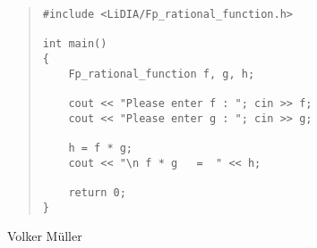 
\EXAMPLES

\begin{quote}
\begin{verbatim}
#include <LiDIA/Fp_rational_function.h>

int main()
{
    Fp_rational_function f, g, h;

    cout << "Please enter f : "; cin >> f;
    cout << "Please enter g : "; cin >> g;

    h = f * g;
    cout << "\n f * g   =  " << h;

    return 0;
}
\end{verbatim}
\end{quote}



\AUTHOR

Volker M\"uller
